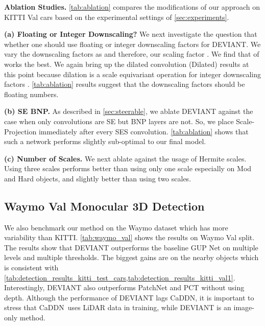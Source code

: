 \documentclass[runningheads]{llncs}
\newcommand{\lidar}{LiDAR}
\newcommand{\equivariant} {equivariant}
\newcommand{\scaleEquivariant} {scale \equivariant}
\newcommand{\MaxScale}{Scale-Projection}
\newcommand{\ses}{SES}
\newcommand{\se}{SE}
\newcommand{\kitti}{KITTI}
\newcommand{\waymo}{Waymo}
\newcommand{\valOne}{Val}
\newcommand{\val}{Val}
\newcommand{\imageOnly}{image-only}
\newcommand{\gupNet}{GUP Net}
\newcommand{\caddn}{CaDDN}
\newcommand{\noIndentHeading}[1]{\noindent\textbf{#1}}
\newcommand{\methodName}{DEVIANT}
\begin{document}
    
\noIndentHeading{Ablation Studies.}\label{sec:results_ablation}
        \cref{tab:ablation} compares the modifications of our approach on \kitti{} \valOne{} cars based on the experimental settings of \cref{sec:experiments}.
        
        \noIndentHeading{(a) Floating or Integer Downscaling?}
        We next investigate the question that whether one should use floating or integer downscaling factors for \methodName.
        We vary the downscaling factors as  and therefore, our scaling factor .
        We find that  of  works the best. 
        We again bring up the dilated convolution (Dilated) results at this point because dilation is a \scaleEquivariant{} operation for integer downscaling factors \cite{worrall2019deep} .
        \cref{tab:ablation} results suggest that the downscaling factors should be floating numbers.


        \noIndentHeading{(b) \se{} BNP.}
        As described in \cref{sec:steerable}, we ablate \methodName{} against the case when only convolutions are \se{} but BNP layers are not. 
        So, we place \MaxScale \cite{sosnovik2020sesn} immediately after every \ses{} convolution. 
        \cref{tab:ablation} shows that such a network performs slightly sub-optimal to our final model.

        \noIndentHeading{(c) Number of Scales.}
        We next ablate against the usage of Hermite scales. 
        Using three scales performs better than using only one scale especially on Mod and Hard objects, and slightly better than using two scales. 
            

\subsection{\waymo{} \val{} Monocular 3D Detection}
        We also benchmark our method on the \waymo{} dataset \cite{sun2020scalability} which has more variability than \kitti.
        \cref{tab:waymo_val} shows the results on \waymo{} \val{} split. 
        The results show that \methodName{} outperforms the baseline \gupNet{} \cite{lu2021geometry} on multiple levels and multiple thresholds. 
        The biggest gains are on the nearby objects which is consistent with \cref{tab:detection_results_kitti_test_cars,tab:detection_results_kitti_val1}.
        Interestingly, \methodName{} also outperforms PatchNet \cite{ma2020rethinking} and PCT \cite{wang2021progressive} without using depth. 
        Although the performance of \methodName{} lags \caddn \cite{reading2021categorical}, it is important to stress that \caddn~uses \lidar{} data in training, while \methodName{} is an \imageOnly{} method. 
\end{document}

